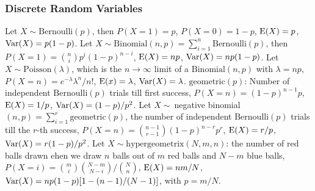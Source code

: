 \subsubsection*{Discrete Random Variables}
 Let $X\sim\mathrm{Bernoulli}(p)$, then $P(X = 1) = p$, $P(X=0) = 1-p$, $\operatorname{E}(X) = p$, $\operatorname{Var}(X) = p(1-p)$.
 Let $X\sim\mathrm{Binomial}(n, p) = \sum^{n}_{i=1} \mathrm{Bernoulli}(p)$, then $P(X = 1) = \binom{n}{i}p^i(1-p)^{n-i}$, $\operatorname{E}(X) = np$, $\operatorname{Var}(X) = np(1-p)$.
 Let $X \sim \mathrm{Poisson}(\lambda)$, which is the $n \to \infty$ limit of a $\mathrm{Binomial}(n,p)$ with $\lambda = np$, $P(X = n) = e^{-\lambda}\lambda^n/n!$, $\operatorname{E}(x) = \lambda$, $\operatorname{Var}(X) = \lambda$.
 $\mathrm{geometric}(p)$: Number of independent $\mathrm{Bernoulli}(p)$ trials till first success, $P(X = n) = (1-p)^{n-1}p$, $\operatorname{E}(X) = 1/p$, $\operatorname{Var}(X) = (1-p)/p^2$.
 Let $X \sim\ $negative binomial$(n,p) = \sum^{r}_{i = 1} \mathrm{geometric}(p)$, the number of independent $\mathrm{Bernoulli}(p)$ trials till the $r$-th success, $P(X = n) = \binom{n-1}{r-1}(1-p)^{n-r} p^r$, $\operatorname{E}(X) = r/p$, $\operatorname{Var}(X) = r(1-p)/p^2$.
 Let $X \sim \mathrm{hypergeometrix}(N,m,n)$: the number of red balls drawn ehen we draw $n$ balls out of $m$ red balls and $N-m$ blue balls, $P(X=i) = \binom{m}{i}\binom{N-m}{N-i}/\binom{N}{n}$, $\operatorname{E}(X) = nm/N$, $\operatorname{Var}(X) = np(1-p)[1-(n-1)/(N-1)]$, with $p = m/N$.